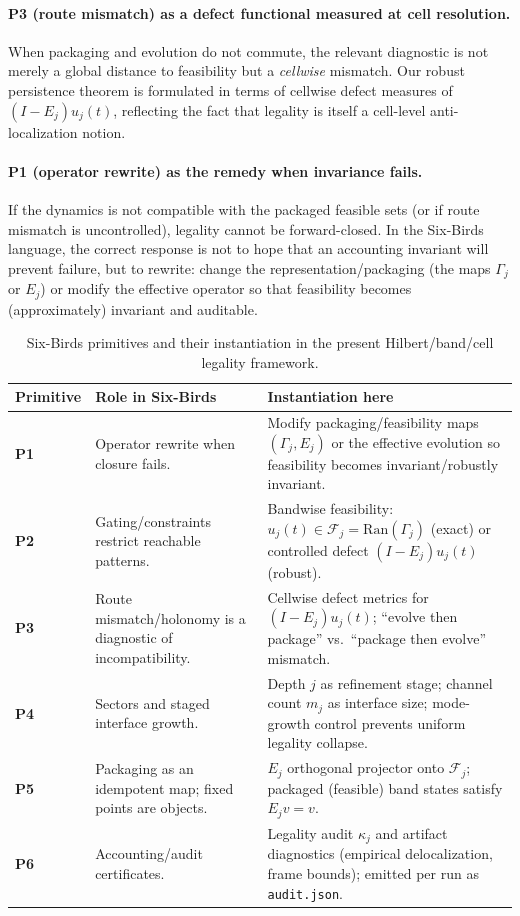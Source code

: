 \documentclass[11pt]{article}
\begin{document}
\paragraph{P3 (route mismatch) as a defect functional measured at cell resolution.}
When packaging and evolution do not commute, the relevant diagnostic is not merely a global distance to feasibility but a \emph{cellwise} mismatch.
Our robust persistence theorem is formulated in terms of cellwise defect measures of $(I-E_j)u_j(t)$, reflecting the fact that legality is itself a cell-level anti-localization notion.

\paragraph{P1 (operator rewrite) as the remedy when invariance fails.}
If the dynamics is not compatible with the packaged feasible sets (or if route mismatch is uncontrolled), legality cannot be forward-closed.
In the Six-Birds language, the correct response is not to hope that an accounting invariant will prevent failure, but to rewrite: change the representation/packaging (the maps $\Gamma_j$ or $E_j$) or modify the effective operator so that feasibility becomes (approximately) invariant and auditable.

\begin{table}[t]
\centering
\caption{Six-Birds primitives \cite{Tsiokos2026SixBirds} and their instantiation in the present Hilbert/band/cell legality framework.}
\label{tab:six-birds-mapping}
\begin{tabular}{@{}p{1.8cm}p{5.4cm}p{7.8cm}@{}}
\toprule
\textbf{Primitive} & \textbf{Role in Six-Birds} & \textbf{Instantiation here} \\
\midrule
\textbf{P1} & Operator rewrite when closure fails. & Modify packaging/feasibility maps $(\Gamma_j,E_j)$ or the effective evolution so feasibility becomes invariant/robustly invariant. \\
\textbf{P2} & Gating/constraints restrict reachable patterns. & Bandwise feasibility: $u_j(t)\in\mathcal{F}_j=\mathrm{Ran}(\Gamma_j)$ (exact) or controlled defect $(I-E_j)u_j(t)$ (robust). \\
\textbf{P3} & Route mismatch/holonomy is a diagnostic of incompatibility. & Cellwise defect metrics for $(I-E_j)u_j(t)$; ``evolve then package'' vs.\ ``package then evolve'' mismatch. \\
\textbf{P4} & Sectors and staged interface growth. & Depth $j$ as refinement stage; channel count $m_j$ as interface size; mode-growth control prevents uniform legality collapse. \\
\textbf{P5} & Packaging as an idempotent map; fixed points are objects. & $E_j$ orthogonal projector onto $\mathcal{F}_j$; packaged (feasible) band states satisfy $E_j v=v$. \\
\textbf{P6} & Accounting/audit certificates. & Legality audit $\kappa_j$ and artifact diagnostics (empirical delocalization, frame bounds); emitted per run as \texttt{audit.json}. \\
\bottomrule
\end{tabular}
\end{table}
\end{document}
